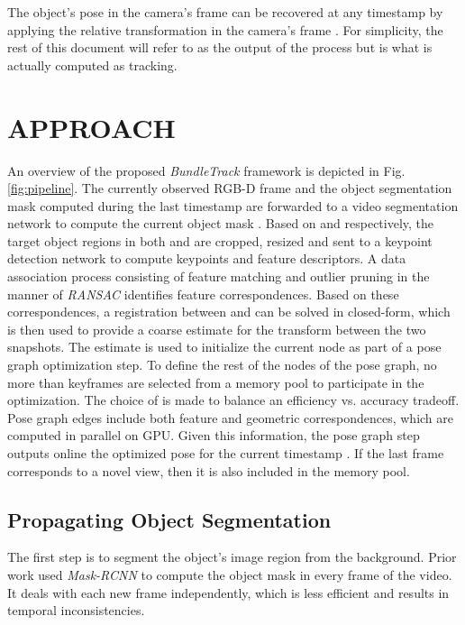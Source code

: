 \documentclass[letterpaper, 10 pt, conference]{ieeeconf}
\begin{document}
The object's pose in the camera's frame  can be recovered at any timestamp by applying the relative transformation  in the camera's frame . For simplicity, the rest of this document will refer to  as the output of the process but  is what is actually computed as tracking.
 
\section{APPROACH}




An overview of the proposed \textit{BundleTrack} framework is depicted in Fig. \ref{fig:pipeline}. The currently observed RGB-D frame  and the object segmentation mask computed during the last timestamp   are forwarded to a video segmentation network to compute the current object mask . Based on  and  respectively, the target object regions in both  and  are cropped, resized and sent to a keypoint detection network to compute keypoints and feature descriptors. A data association process consisting of feature matching and outlier pruning in the manner of \textit{RANSAC} \cite{fischler1981random} identifies feature correspondences. Based on these correspondences, a registration between  and  can be solved in closed-form, which is then used to provide a coarse estimate  for the transform between the two snapshots. The estimate  is used to initialize the current node  as part of a pose graph optimization step. To define the rest of the nodes of the pose graph, no more than  keyframes are selected from a memory pool to participate in the optimization. The choice of  is made to balance an efficiency vs. accuracy tradeoff. Pose graph edges include both feature and geometric correspondences, which are computed in parallel on GPU. Given this information, the pose graph step outputs online the optimized pose for the current timestamp . If the last frame corresponds to a novel view, then it is also included in the memory pool. 


\subsection{Propagating Object Segmentation}
\label{sec:video_seg}




The first step is to segment the object's image region from the background. Prior work \cite{runz2018maskfusion} used \textit{Mask-RCNN} \cite{he2017mask} to compute the object mask in every frame of the video. It deals with each new frame independently, which is less efficient and results in temporal inconsistencies. 
\end{document}
